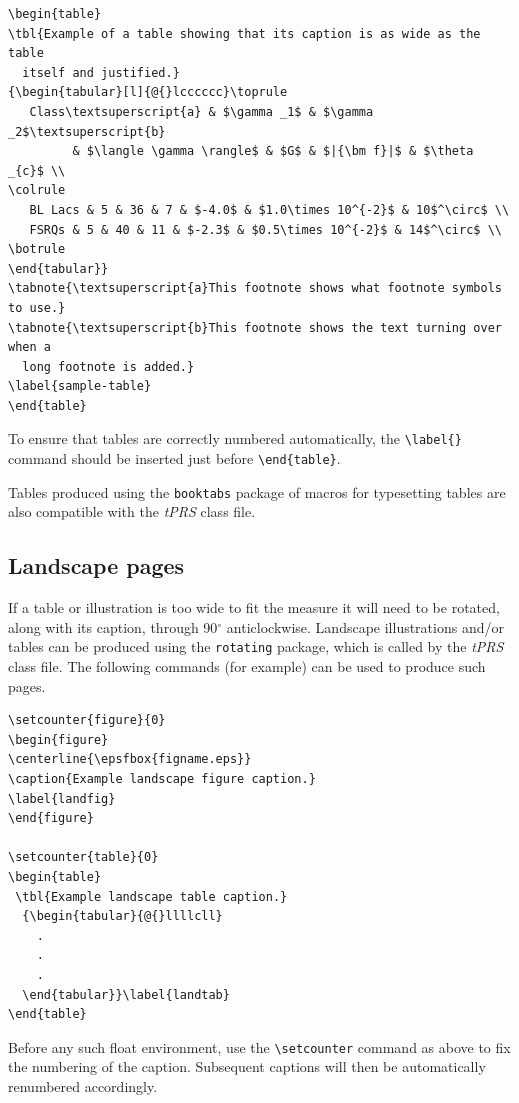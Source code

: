 \documentclass{tPRS2e}
\begin{document}
\begin{verbatim}
\begin{table}
\tbl{Example of a table showing that its caption is as wide as the table
  itself and justified.}
{\begin{tabular}[l]{@{}lcccccc}\toprule
   Class\textsuperscript{a} & $\gamma _1$ & $\gamma _2$\textsuperscript{b}
         & $\langle \gamma \rangle$ & $G$ & $|{\bm f}|$ & $\theta _{c}$ \\
\colrule
   BL Lacs & 5 & 36 & 7 & $-4.0$ & $1.0\times 10^{-2}$ & 10$^\circ$ \\
   FSRQs & 5 & 40 & 11 & $-2.3$ & $0.5\times 10^{-2}$ & 14$^\circ$ \\
\botrule
\end{tabular}}
\tabnote{\textsuperscript{a}This footnote shows what footnote symbols to use.}
\tabnote{\textsuperscript{b}This footnote shows the text turning over when a
  long footnote is added.}
\label{sample-table}
\end{table}
\end{verbatim}

To ensure that tables are correctly numbered automatically, the \verb"\label{}" command should be inserted just before \verb"\end{table}".

Tables produced using the \texttt{booktabs} package of macros for typesetting tables are also compatible with the \textit{tPRS} class file.


\subsection{Landscape pages}\label{landscape}

If a table or illustration is too wide to fit the measure it will need to be rotated, along with its caption, through 90$^{\circ}$ anticlockwise.
Landscape illustrations and/or tables can be produced using the \verb"rotating" package, which is called by the \textit{tPRS} class file.
The following commands (for example) can be used to produce such pages.
\begin{verbatim}
\setcounter{figure}{0}
\begin{figure}
\centerline{\epsfbox{figname.eps}}
\caption{Example landscape figure caption.}
\label{landfig}
\end{figure}

\setcounter{table}{0}
\begin{table}
 \tbl{Example landscape table caption.}
  {\begin{tabular}{@{}llllcll}
    .
    .
    .
  \end{tabular}}\label{landtab}
\end{table}
\end{verbatim}
Before any such float environment, use the \verb"\setcounter" command as above to fix the numbering of the caption. Subsequent captions will then be automatically renumbered accordingly.
\end{document}
